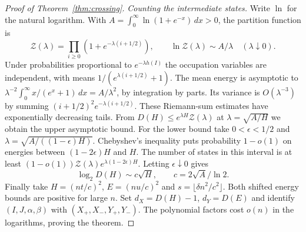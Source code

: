 \begin{proof}[Proof of Theorem~\ref{thm:crossing}]
\smallskip\noindent\emph{Counting the intermediate states.}
Write $\ln$ for the
natural logarithm. With
$A=\int_0^\infty\ln(1+e^{-x})\,dx>0$, the partition function is
\[
  \mathcal Z(\lambda)=\prod_{i\ge0}(1+e^{-\lambda(i+1/2)}),
  \qquad \ln\mathcal Z(\lambda)\sim A/\lambda
  \quad(\lambda\downarrow0).
\]
Under probabilities proportional to $e^{-\lambda h(I)}$ the occupation
variables are independent, with means $1/(e^{\lambda(i+1/2)}+1)$.
The mean energy is asymptotic to
$\lambda^{-2}\int_0^\infty x/(e^x+1)\,dx=A/\lambda^2$,
by integration by parts. Its variance is $O(\lambda^{-3})$ by
summing $(i+1/2)^2e^{-\lambda(i+1/2)}$. These Riemann-sum
estimates have exponentially decreasing tails. From
$D(H)\le e^{\lambda H}\mathcal Z(\lambda)$ at
$\lambda=\sqrt{A/H}$ we obtain the upper asymptotic bound. For the
lower bound take $0<\epsilon<1/2$ and
$\lambda=\sqrt{A/((1-\epsilon)H)}$. Chebyshev's inequality puts
probability $1-o(1)$ on energies between $(1-2\epsilon)H$ and $H$.
The number of states in this interval is at least
$(1-o(1))\mathcal Z(\lambda)e^{\lambda(1-2\epsilon)H}$.
Letting $\epsilon\downarrow0$ gives
\[
     \log_2 D(H)\sim c\sqrt H,\qquad c=2\sqrt A/\ln 2 .
\]
Finally take $H=(nt/c)^2$, $E=(nu/c)^2$ and
$s=\lfloor\delta n^2/c^2\rfloor$. Both shifted energy bounds are
positive for large $n$. Set $d_X=D(H)-1$, $d_Y=D(E)$ and identify
$(I,J,\alpha,\beta)$ with $(X_+,X_-,Y_+,Y_-)$. The polynomial
factors cost $o(n)$ in the logarithms, proving the theorem.
\end{proof}
